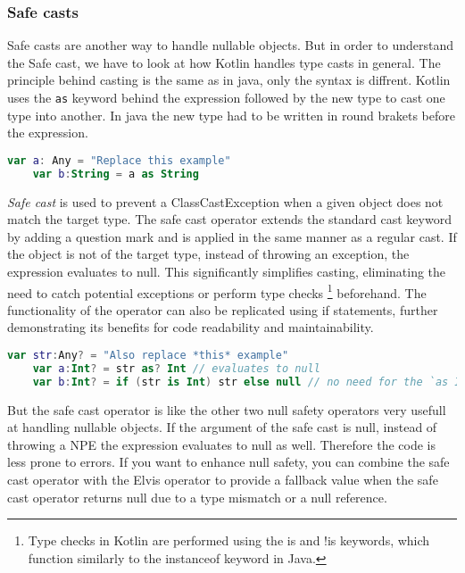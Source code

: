 \documentclass[a4paper, 11pt]{article}
\begin{document}
\subsubsection{Safe casts}
  Safe casts are another way to handle nullable objects. But in order to understand the Safe cast, we have to look at how Kotlin handles type casts in general. The principle behind casting is the same as in java, only the syntax is diffrent. Kotlin uses the \texttt{as} keyword behind the expression followed by the new type to cast one type into another. In java the new type had to be written in round brakets before the expression.
  \begin{lstlisting}[language=Kotlin,title={Casting in Kotlin}]
    var a: Any = "Replace this example"
    var b:String = a as String
  \end{lstlisting} %
  \textit{Safe cast} is used to prevent a ClassCastException when a given object does not match the target type. The safe cast operator extends the standard cast keyword by adding a question mark and is applied in the same manner as a regular cast. If the object is not of the target type, instead of throwing an exception, the expression evaluates to null. This significantly simplifies casting, eliminating the need to catch potential exceptions or perform type checks \footnote{Type checks in Kotlin are performed using the is and !is keywords, which function similarly to the instanceof keyword in Java.} beforehand. The functionality of the operator can also be replicated using if statements, further demonstrating its benefits for code readability and maintainability.
  \begin{lstlisting}[language=Kotlin,title={Usage of the safe cast operator in comparisopn to an if statement}]
    var str:Any? = "Also replace *this* example"
    var a:Int? = str as? Int // evaluates to null
    var b:Int? = if (str is Int) str else null // no need for the `as Int` here due to smart casting
  \end{lstlisting}
  But the safe cast operator is like the other two null safety operators very usefull at handling nullable objects. If the argument of the safe cast is null, instead of throwing a NPE the expression evaluates to null as well. Therefore the code is less prone to errors. If you want to enhance null safety, you can combine the safe cast operator with the Elvis operator to provide a fallback value when the safe cast operator returns null due to a type mismatch or a null reference.
\end{document}
